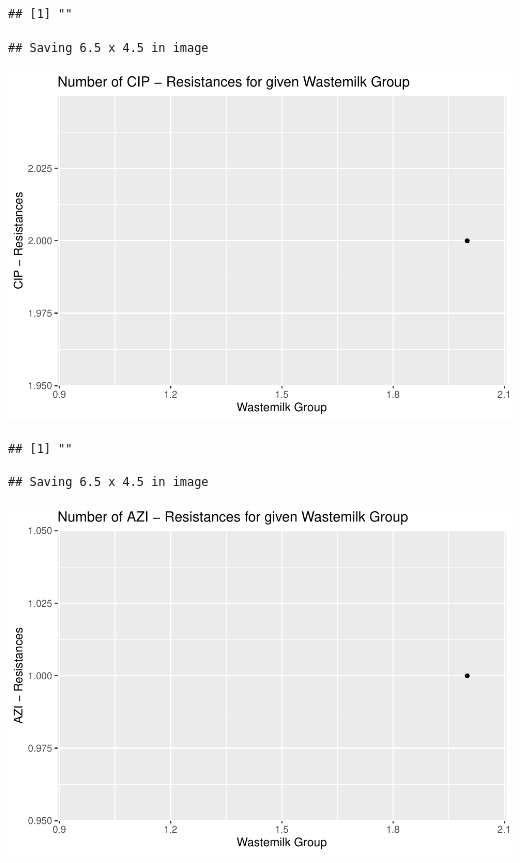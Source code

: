 \documentclass[
]{article}
\begin{document}
\begin{verbatim}
## [1] ""
\end{verbatim}

\begin{verbatim}
## Saving 6.5 x 4.5 in image
\end{verbatim}

\includegraphics{NResistenzen_files/figure-latex/binary_or_nominal_variables-2.pdf}

\begin{verbatim}
## [1] ""
\end{verbatim}

\begin{verbatim}
## Saving 6.5 x 4.5 in image
\end{verbatim}

\includegraphics{NResistenzen_files/figure-latex/binary_or_nominal_variables-3.pdf}
\end{document}
